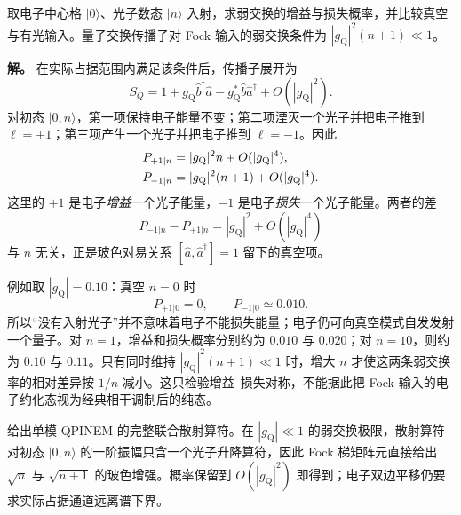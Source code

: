 
\begin{exbox}
取电子中心格 $|0\rangle$、光子数态 $|n\rangle$ 入射，求弱交换的增益与损失概率，并比较真空与有光输入。量子交换传播子对 Fock 输入的弱交换条件为 $|g_{\mathrm Q}|^2(n+1)\ll1$。

\textbf{解。} 在实际占据范围内满足该条件后，传播子展开为
\begin{equation*}
 S_Q
 =1+g_{\mathrm Q}\hat b^\dagger\hat a
 -g_{\mathrm Q}^*\hat b\hat a^\dagger+O(|g_{\mathrm Q}|^2).
\end{equation*}
对初态 $|0,n\rangle$，第一项保持电子能量不变；第二项湮灭一个光子并把电子推到 $\ell=+1$；第三项产生一个光子并把电子推到 $\ell=-1$。因此
\begin{align}
 P_{+1|n}&=|g_{\mathrm Q}|^2n+O(|g_{\mathrm Q}|^4),\notag\\
 P_{-1|n}&=|g_{\mathrm Q}|^2(n+1)+O(|g_{\mathrm Q}|^4).
 \label{eq:qpinem-gain-loss-n-nplus1-dp65}
\end{align}
这里的 $+1$ 是电子\emph{增益}一个光子能量，$-1$ 是电子\emph{损失}一个光子能量。两者的差
\begin{equation}
 \boxed{P_{-1|n}-P_{+1|n}=|g_{\mathrm Q}|^2+O(|g_{\mathrm Q}|^4)}
 \label{eq:qpinem-spontaneous-difference-dp65}
\end{equation}
与 $n$ 无关，正是玻色对易关系 $[\hat a,\hat a^\dagger]=1$ 留下的真空项。

例如取 $|g_{\mathrm Q}|=0.10$：真空 $n=0$ 时
\begin{equation*}
 P_{+1|0}=0,
 \qquad
 P_{-1|0}\simeq0.010.
\end{equation*}
所以“没有入射光子”并不意味着电子不能损失能量；电子仍可向真空模式自发发射一个量子。对 $n=1$，增益和损失概率分别约为 $0.010$ 与 $0.020$；对 $n=10$，则约为 $0.10$ 与 $0.11$。只有同时维持 $|g_{\mathrm Q}|^2(n+1)\ll1$ 时，增大 $n$ 才使这两条弱交换率的相对差异按 $1/n$ 减小。这只检验增益--损失对称，不能据此把 Fock 输入的电子约化态视为经典相干调制后的纯态。


\medskip

 给出单模 QPINEM 的完整联合散射算符。在 $|g_{\mathrm Q}|\ll1$ 的弱交换极限，散射算符对初态 $|0,n\rangle$ 的一阶振幅只含一个光子升降算符，因此 Fock 梯矩阵元直接给出 $\sqrt n$ 与 $\sqrt{n+1}$ 的玻色增强。概率保留到 $O(|g_{\mathrm Q}|^2)$ 即得到；电子双边平移仍要求实际占据通道远离谱下界。



\end{exbox}
